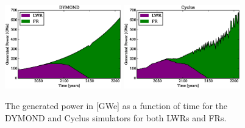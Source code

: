 \begin{figure}[htb]
\centering
\includegraphics[width=0.45\textwidth]{gwe-dymond.eps}
\includegraphics[width=0.45\textwidth]{gwe-cyclus.eps}
\caption{The generated power in [GWe] as a function of time for the DYMOND and 
Cyclus simulators for both LWRs and FRs.}
\label{gwe-simulators}
\end{figure}

\clearpage